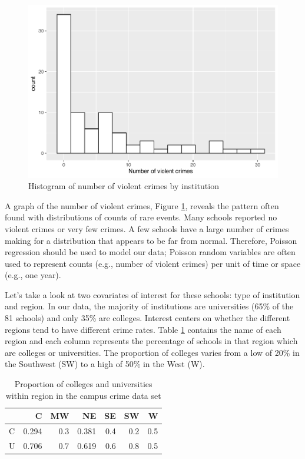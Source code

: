 \documentclass[
]{krantz}
\begin{document}
\begin{figure}

{\centering \includegraphics[width=0.6\linewidth]{bookdown-BeyondMLR_files/figure-latex/nviolent-1} 

}

\caption{Histogram of number of violent crimes by institution}\label{fig:nviolent}
\end{figure}

A graph of the number of violent crimes, Figure \ref{fig:nviolent}, reveals the pattern often found with distributions of counts of rare events. Many schools reported no violent crimes or very few crimes. A few schools have a large number of crimes making for a distribution that appears to be far from normal. Therefore, Poisson regression should be used to model our data; Poisson random variables are often used to represent counts (e.g., number of violent crimes) per unit of time or space (e.g., one year).

Let's take a look at two covariates of interest for these schools: type of institution and region. In our data, the majority of institutions are universities (65\% of the 81 schools) and only 35\% are colleges. Interest centers on whether the different regions tend to have different crime rates. Table \ref{tab:regions} contains the name of each region and each column represents the percentage of schools in that region which are colleges or universities. The proportion of colleges varies from a low of 20\% in the Southwest (SW) to a high of 50\% in the West (W).

\begin{table}

\caption{\label{tab:regions}Proportion of colleges and universities within region in the campus crime data set}
\centering
\begin{tabular}[t]{lrrrrrr}
\toprule
  & C & MW & NE & SE & SW & W\\
\midrule
C & 0.294 & 0.3 & 0.381 & 0.4 & 0.2 & 0.5\\
U & 0.706 & 0.7 & 0.619 & 0.6 & 0.8 & 0.5\\
\bottomrule
\end{tabular}
\end{table}
\end{document}
